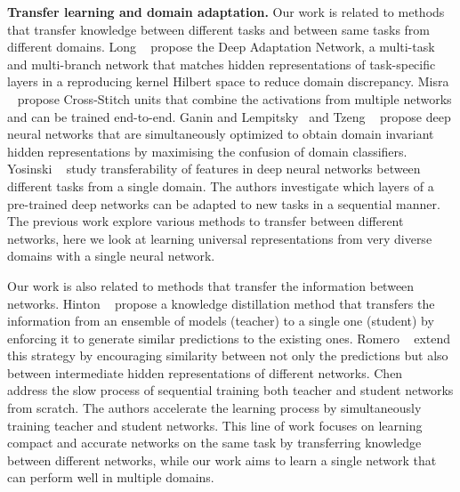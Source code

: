 \documentclass[10pt,twocolumn,letterpaper]{article}
\renewcommand{\paragraph}[1]{\par\medskip\noindent\textbf{#1}}
\begin{document}
\paragraph{Transfer learning and domain adaptation.} Our work is related to methods that transfer knowledge between different tasks and between same tasks from different domains. Long \etal~\cite{long2015learning} propose the Deep Adaptation Network, a multi-task and multi-branch network that matches hidden representations of task-specific layers in a reproducing kernel Hilbert space to reduce domain discrepancy. Misra \etal~\cite{misra2016cross} propose Cross-Stitch units that combine the activations from multiple networks and can be trained end-to-end. Ganin and Lempitsky~\cite{ganin2015unsupervised} and Tzeng \etal~\cite{tzeng2015simultaneous} propose deep neural networks that are simultaneously optimized to obtain domain invariant hidden representations by maximising the confusion of domain classifiers. Yosinski \etal~\cite{yosinski14how-transferable} study transferability of features in deep neural networks between different tasks from a single domain. The authors investigate which layers of a pre-trained deep networks can be adapted to new tasks in a sequential manner. The previous work explore various methods to transfer between different networks, here we look at learning universal representations from very diverse domains with a single neural network.

Our work is also related to methods \cite{hinton2015distilling,romero2014fitnets,chen2015net2net} that transfer the information between networks. Hinton \etal~\cite{hinton2015distilling} propose a knowledge distillation method that transfers the information from an ensemble of models (teacher) to a single one (student) by enforcing it to generate similar predictions to the existing ones. Romero \etal~\cite{romero2014fitnets} extend this strategy by encouraging similarity between not only the predictions but also between intermediate hidden representations of different networks. Chen~\etal~\cite{chen2015net2net} address the slow process of sequential training both teacher and student networks from scratch. The authors accelerate the learning process by simultaneously training teacher and student networks. This line of work focuses on learning compact and accurate networks on the same task by transferring knowledge between different networks, while our work aims to learn a single network that can perform well in multiple domains.
 
\end{document}
